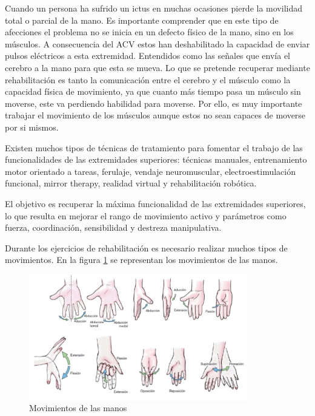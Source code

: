 Cuando un persona ha sufrido un ictus en muchas ocasiones pierde la movilidad total o parcial de la mano. Es importante comprender que en este tipo de afecciones el problema no se inicia en un defecto físico de la mano, sino en los músculos. A consecuencia del ACV estos han deshabilitado la capacidad de enviar pulsos eléctricos a esta extremidad. Entendidos como las señales que envía el cerebro a la mano para que esta se mueva. Lo que se pretende recuperar mediante rehabilitación es tanto la comunicación entre el cerebro y el músculo como la capacidad física de movimiento, ya que cuanto más tiempo pasa un músculo sin moverse, este va perdiendo habilidad para moverse. Por ello, es muy importante trabajar el movimiento de los músculos aunque estos no sean capaces de moverse por si mismos.


Existen muchos tipos de técnicas de tratamiento para fomentar el trabajo de las funcionalidades de las extremidades superiores: técnicas manuales, entrenamiento motor orientado a tareas, ferulaje, vendaje neuromuscular, electroestimulación funcional, %
mirror therapy, %
realidad virtual y rehabilitación robótica.


El objetivo es recuperar la máxima funcionalidad de las extremidades superiores, lo que resulta en mejorar el rango de movimiento activo y parámetros como fuerza, coordinación, sensibilidad y destreza manipulativa.

Durante los ejercicios de rehabilitación es necesario realizar muchos tipos de movimientos. En la figura \ref{fig:movManos} se representan los movimientos de las manos. %

\begin{figure}[H]
	\centering
	\includegraphics[width=0.85\textwidth]{./img/ejerciciosRehManp}
	\caption{Movimientos de las manos \cite{movimientoMano}} 
	\label{fig:movManos}
\end{figure}


